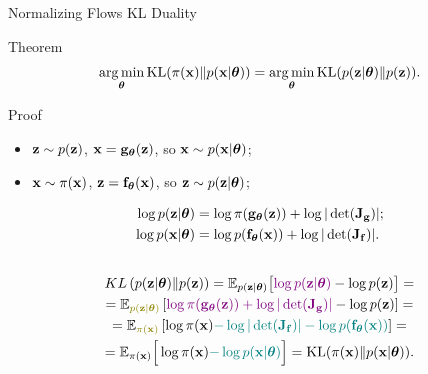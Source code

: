\documentclass{beamer}
\begin{document}
\begin{frame}{Normalizing Flows KL Duality}
	\begin{block}{Theorem}
		\vspace{-0.3cm}
		\[
			\operatorname*{arg\,min}_{\boldsymbol{\theta}} \mathrm{KL}(\pi(\mathbf{x}) \| p(\mathbf{x} | \boldsymbol{\theta})) = \operatorname*{arg\,min}_{\boldsymbol{\theta}} \mathrm{KL}(p(\mathbf{z} | \boldsymbol{\theta}) \| p(\mathbf{z})).
		\]
		\vspace{-0.5cm}
	\end{block}
	\begin{block}{Proof}
		\begin{itemize}
			\item $\mathbf{z} \sim p(\mathbf{z})$, $\mathbf{x} = \mathbf{g}_{\boldsymbol{\theta}}(\mathbf{z})$, so $\mathbf{x} \sim p(\mathbf{x}| \boldsymbol{\theta})$;
			\item $\mathbf{x} \sim \pi(\mathbf{x})$, $\mathbf{z} = \mathbf{f}_{\boldsymbol{\theta}}(\mathbf{x})$, so $\mathbf{z} \sim p(\mathbf{z} | \boldsymbol{\theta})$;
		\end{itemize}
		\vspace{-0.3cm}
		\begin{align*}
			\log p(\mathbf{z} | \boldsymbol{\theta}) &= \log \pi(\mathbf{g}_{\boldsymbol{\theta}}(\mathbf{z})) + \log | \det ( \mathbf{J}_{\mathbf{g}}) |; \\
			\log p(\mathbf{x} | \boldsymbol{\theta}) &= \log p(\mathbf{f}_{\boldsymbol{\theta}}(\mathbf{x})) + \log | \det ( \mathbf{J}_{\mathbf{f}}) |.
		\end{align*}
		\vspace{-1.5cm}
		\begin{multline*}
			\\KL\left(p(\bz | \btheta) \| p(\bz) \right) = \bbE_{p(\bz | \btheta)} \bigl[ {\color{violet}\log p(\bz | \btheta)} - \log p(\bz) \bigr] = \\ 
			= \bbE_{{\color{olive}p(\bz | \btheta)}} \left[ {\color{violet}\log \pi(\bg_{\btheta}(\bz)) +  \log |\det (\bJ_\bg)|} - \log p(\bz) \right] = \\
			= \bbE_{{\color{olive}\pi(\bx)}} \left[ \log \pi(\bx) {\color{teal} - \log |\det (\bJ_\bff)| - \log p(\bff_{\btheta}(\bx))} \right] = \\
			= \bbE_{\pi(\bx)} \Big[ \log \pi(\bx) {\color{teal} -\log p(\bx | \btheta)} \Big] = \KL (\pi(\bx) \| p(\bx | \btheta)).
		\end{multline*}
	\end{block}
\end{frame}
\end{document}
